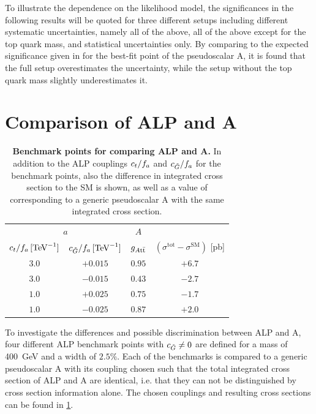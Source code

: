 To illustrate the dependence on the likelihood model, the significances in the following results will be quoted for three different setups including different systematic uncertainties, namely all of the above, all of the above except for the top quark mass, and statistical uncertainties only. By comparing to the expected significance given in  for the best-fit point of the pseudoscalar A, it is found that the full setup overestimates the uncertainty, while the setup without the top quark mass slightly underestimates it. 

\section{Comparison of ALP and A}
\label{sec:alps:ALPvsA}

\begin{table}
\centering
\begin{tabular}{cc |c | c}
\multicolumn{2}{c}{$a$} & $A$ \\
$c_t/f_a \,  [\text{TeV}^{-1}]$ & $c_{\tilde{G}}/f_a \,  [\text{TeV}^{-1}]$ & $g_{A\mathrm{t \bar{t}}}$ & $(\sigma^\text{tot}-\sigma^\text{SM})$ [pb] \\
\hline
\hline
$3.0$ & $+0.015$ & $0.95$ & $+6.7$ \\
$3.0$ & $-0.015$ & $0.43$ & $-2.7$ \\
$1.0$ & $+0.025$ & $0.75$ & $-1.7$ \\
$1.0$ & $-0.025$ & $0.87$ & $+2.0$ \\
\end{tabular}
\caption{\textbf{Benchmark points for comparing ALP and A.} In addition to the ALP couplings $c_t/f_a$ and $c_{\tilde{G}}/f_a$ for the benchmark points, also the difference in integrated cross section to the SM is shown, as well as a value of \gAtt corresponding to a generic pseudoscalar A with the same integrated cross section.}
\label{tab:alps:benchmarks}
\end{table}

To investigate the differences and possible discrimination between ALP and A, four different ALP benchmark points with $c_{\tilde{G}} \neq 0$ are defined for a mass of \SI{400}{\GeV} and a width of $2.5\%$. Each of the benchmarks is compared to a generic pseudoscalar A with its coupling \gAtt chosen such that the total integrated cross section of ALP and A are identical, i.e. that they can not be distinguished by cross section information alone. The chosen couplings and resulting cross sections can be found in \cref{tab:alps:benchmarks}.

